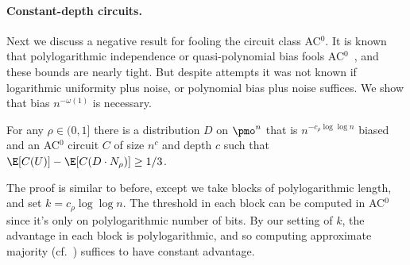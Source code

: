 \paragraph{Constant-depth circuits.}
Next we discuss a negative result for fooling the circuit class AC$^{0}$.  It is known that polylogarithmic independence or quasi-polynomial bias fools AC$^{0}$~\cite{Bazzi07,Razborov09,Braverman10,Tal17}, and these bounds are nearly tight.  But despite attempts \cite{LV-sum} it was not known if logarithmic uniformity plus noise, or polynomial bias plus noise suffices. We show that bias $n^{-\omega(1)}$ is necessary.

\begin{corollary} \label{cor:ac0-const-advant} For any $\rho\in(0,1]$ there is a distribution $D$ on $\pmo^n$
that is $n^{-c_\rho \log\log n}$ biased and an \textnormal{AC}$^0$ circuit $C$ of size $n^c$ and depth $c$ such that $\E[C(U)]-\E[C(D \cdot N_\rho)] \geq 1/3$.
\end{corollary}

The proof is similar to before, except we take blocks of polylogarithmic length, and set $k = c_\rho \log \log n$.  The threshold in each block can be computed in AC$^0$ since it's only on polylogarithmic number of bits.  By our setting of $k$, the advantage in each block is polylogarithmic, and so computing approximate majority \cite{Ajt83} (cf.~\cite{ViolaBPvsE}) suffices to have constant advantage.

%
%
%
%
%
%
%
%
%


